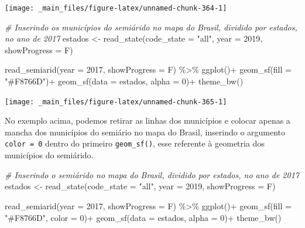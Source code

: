 \documentclass[
  brazilian,
]{book}
\newenvironment{Shaded}{\begin{snugshade}}{\end{snugshade}}
\newcommand{\AttributeTok}[1]{\textcolor[rgb]{0.77,0.63,0.00}{#1}}
\newcommand{\CommentTok}[1]{\textcolor[rgb]{0.56,0.35,0.01}{\textit{#1}}}
\newcommand{\DecValTok}[1]{\textcolor[rgb]{0.00,0.00,0.81}{#1}}
\newcommand{\FunctionTok}[1]{\textcolor[rgb]{0.00,0.00,0.00}{#1}}
\newcommand{\NormalTok}[1]{#1}
\newcommand{\OtherTok}[1]{\textcolor[rgb]{0.56,0.35,0.01}{#1}}
\newcommand{\SpecialCharTok}[1]{\textcolor[rgb]{0.00,0.00,0.00}{#1}}
\newcommand{\StringTok}[1]{\textcolor[rgb]{0.31,0.60,0.02}{#1}}
\begin{document}
\begin{center}\texttt{[image: \_main\_files/figure-latex/unnamed-chunk-364-1]} \end{center}

\begin{Shaded}
\begin{Highlighting}[]
\CommentTok{\# Inserindo os municípios do semiárido no mapa do Brasil, dividido por estados, no ano de 2017}
\NormalTok{estados }\OtherTok{\textless{}{-}} \FunctionTok{read\_state}\NormalTok{(}\AttributeTok{code\_state =} \StringTok{"all"}\NormalTok{,}
                      \AttributeTok{year =} \DecValTok{2019}\NormalTok{,}
                      \AttributeTok{showProgress =}\NormalTok{ F)}

\FunctionTok{read\_semiarid}\NormalTok{(}\AttributeTok{year =} \DecValTok{2017}\NormalTok{,}
              \AttributeTok{showProgress =}\NormalTok{ F) }\SpecialCharTok{\%\textgreater{}\%} 
  \FunctionTok{ggplot}\NormalTok{()}\SpecialCharTok{+}
  \FunctionTok{geom\_sf}\NormalTok{(}\AttributeTok{fill =} \StringTok{"\#F8766D"}\NormalTok{)}\SpecialCharTok{+}
  \FunctionTok{geom\_sf}\NormalTok{(}\AttributeTok{data =}\NormalTok{ estados, }\AttributeTok{alpha =} \DecValTok{0}\NormalTok{)}\SpecialCharTok{+}
  \FunctionTok{theme\_bw}\NormalTok{()}
\end{Highlighting}
\end{Shaded}

\begin{center}\texttt{[image: \_main\_files/figure-latex/unnamed-chunk-365-1]} \end{center}

No exemplo acima, podemos retirar as linhas dos municípios e colocar apenas a mancha dos municípios do semiário no mapa do Brasil, inserindo o argumento \texttt{color\ =\ 0} dentro do primeiro \texttt{geom\_sf()}, esse referente à geometria dos municípios do semiárido.

\begin{Shaded}
\begin{Highlighting}[]
\CommentTok{\# Inserindo o semiárido no mapa do Brasil, dividido por estados, no ano de 2017}
\NormalTok{estados }\OtherTok{\textless{}{-}} \FunctionTok{read\_state}\NormalTok{(}\AttributeTok{code\_state =} \StringTok{"all"}\NormalTok{,}
                      \AttributeTok{year =} \DecValTok{2019}\NormalTok{,}
                      \AttributeTok{showProgress =}\NormalTok{ F)}

\FunctionTok{read\_semiarid}\NormalTok{(}\AttributeTok{year =} \DecValTok{2017}\NormalTok{,}
              \AttributeTok{showProgress =}\NormalTok{ F) }\SpecialCharTok{\%\textgreater{}\%} 
  \FunctionTok{ggplot}\NormalTok{()}\SpecialCharTok{+}
  \FunctionTok{geom\_sf}\NormalTok{(}\AttributeTok{fill =} \StringTok{"\#F8766D"}\NormalTok{, }\AttributeTok{color =} \DecValTok{0}\NormalTok{)}\SpecialCharTok{+}
  \FunctionTok{geom\_sf}\NormalTok{(}\AttributeTok{data =}\NormalTok{ estados, }\AttributeTok{alpha =} \DecValTok{0}\NormalTok{)}\SpecialCharTok{+}
  \FunctionTok{theme\_bw}\NormalTok{()}
\end{Highlighting}
\end{Shaded}
\end{document}
